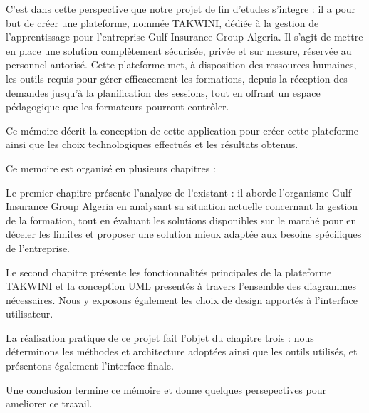 \documentclass{article}
\begin{document}
C’est dans cette perspective que notre projet de fin d’etudes s’integre : il a pour but de créer une plateforme, nommée TAKWINI, dédiée à la gestion de l’apprentissage pour l’entreprise Gulf Insurance Group Algeria. 
Il s’agit de mettre en place une solution complètement sécurisée, privée et sur mesure, réservée au personnel autorisé. Cette plateforme met, à disposition des ressources humaines, les outils requis pour gérer efficacement les formations, depuis la réception des demandes jusqu’à la planification des sessions, tout en offrant un espace pédagogique que les formateurs pourront contrôler. 

\vspace{0.5cm}

Ce mémoire décrit la conception de cette application pour créer cette plateforme ainsi que  les choix technologiques effectués et les résultats obtenus. 

\vspace{0.5cm}

\noindent Ce memoire est organisé en plusieurs chapitres :

\vspace{0.5cm}

\noindent Le premier chapitre présente  l’analyse de l’existant : il aborde l’organisme Gulf Insurance Group Algeria en analysant sa situation actuelle concernant la gestion de la formation, tout en évaluant les solutions disponibles sur le marché pour en déceler les limites et proposer une solution mieux adaptée aux besoins spécifiques de l’entreprise.

\vspace{0.5cm}

\noindent Le second chapitre présente les fonctionnalités principales de la plateforme TAKWINI et la conception UML presentés à travers l’ensemble des diagrammes nécessaires. Nous y exposons également les choix de design apportés à l’interface utilisateur. 

\vspace{0.5cm}

\noindent La réalisation pratique de ce projet fait l’objet du chapitre trois : nous déterminons les méthodes et architecture adoptées ainsi que les outils utilisés, et présentons également l’interface finale.   

\vspace{0.5cm}

\noindent Une conclusion termine ce mémoire et donne quelques persepectives pour ameliorer ce travail.
\end{document}
